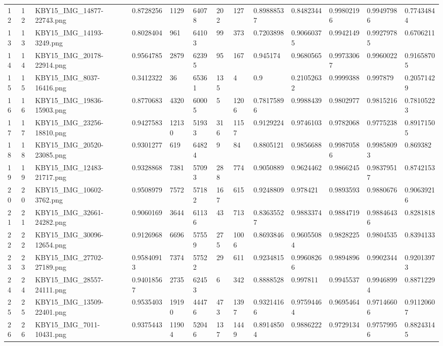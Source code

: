 \documentclass[11pt, a4paper, twoside]{report}
\begin{document}
\begin{longtable}[c]{@{}lllllllllllll@{}}
12 & 12 & KBY15\_IMG\_14877-22743.png & 0.8728256 & 1129 & 64078 & 202 & 127 & 0.89888537 & 0.8482344 & 0.99802196 & 0.99497986 & 0.77434844 \\
13 & 13 & KBY15\_IMG\_14193-3249.png & 0.8028404 & 961 & 64103 & 99 & 373 & 0.7203898 & 0.90660375 & 0.9942149 & 0.99279785 & 0.6706211 \\
14 & 14 & KBY15\_IMG\_20178-22914.png & 0.9564785 & 2879 & 62395 & 95 & 167 & 0.945174 & 0.9680565 & 0.99733067 & 0.9960022 & 0.91658705 \\
15 & 15 & KBY15\_IMG\_8037-16416.png & 0.3412322 & 36 & 65361 & 135 & 4 & 0.9 & 0.21052632 & 0.9999388 & 0.997879 & 0.20571429 \\
16 & 16 & KBY15\_IMG\_19836-15903.png & 0.8770683 & 4320 & 60005 & 5 & 1206 & 0.78175896 & 0.9988439 & 0.9802977 & 0.9815216 & 0.78105223 \\
17 & 17 & KBY15\_IMG\_23256-18810.png & 0.9427583 & 12130 & 51933 & 316 & 1157 & 0.9129224 & 0.9746103 & 0.9782068 & 0.9775238 & 0.89171505 \\
18 & 18 & KBY15\_IMG\_20520-23085.png & 0.9301277 & 619 & 64824 & 9 & 84 & 0.8805121 & 0.9856688 & 0.99870586 & 0.99858093 & 0.869382 \\
19 & 19 & KBY15\_IMG\_12483-21717.png & 0.9328868 & 7381 & 57093 & 288 & 774 & 0.9050889 & 0.9624462 & 0.9866245 & 0.98379517 & 0.8742153 \\
20 & 20 & KBY15\_IMG\_10602-3762.png & 0.9508979 & 7572 & 57182 & 167 & 615 & 0.9248809 & 0.978421 & 0.9893593 & 0.9880676 & 0.90639216 \\
21 & 21 & KBY15\_IMG\_32661-24282.png & 0.9060169 & 3644 & 61136 & 43 & 713 & 0.83635527 & 0.9883374 & 0.9884719 & 0.98846436 & 0.8281818 \\
22 & 22 & KBY15\_IMG\_30096-12654.png & 0.9126968 & 6696 & 57559 & 275 & 1006 & 0.8693846 & 0.96055084 & 0.9828225 & 0.9804535 & 0.8394133 \\
23 & 23 & KBY15\_IMG\_27702-27189.png & 0.95840913 & 7374 & 57522 & 29 & 611 & 0.9234815 & 0.99608266 & 0.9894896 & 0.9902344 & 0.92013973 \\
24 & 24 & KBY15\_IMG\_28557-24111.png & 0.94018567 & 2735 & 62453 & 6 & 342 & 0.8888528 & 0.997811 & 0.9945537 & 0.99468994 & 0.8871229 \\
25 & 25 & KBY15\_IMG\_13509-22401.png & 0.9535403 & 19190 & 44476 & 473 & 1397 & 0.93214166 & 0.97594464 & 0.9695464 & 0.97146606 & 0.91120607 \\
26 & 26 & KBY15\_IMG\_7011-10431.png & 0.9375443 & 11904 & 52046 & 137 & 1449 & 0.89148504 & 0.9886222 & 0.9729134 & 0.97579956 & 0.88243145 \\

\end{longtable}
\end{document}
